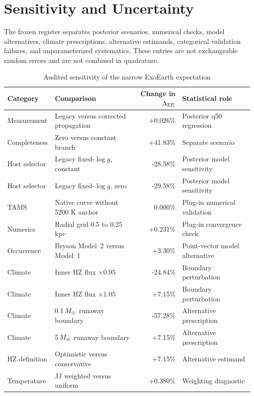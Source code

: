 \section{Sensitivity and Uncertainty}\label{sec:sensitivity}

The frozen register separates posterior scenarios, numerical checks, model
alternatives, climate prescriptions, alternative estimands, categorical
validation failures, and unparameterized systematics. These entries are not
exchangeable random errors and are not combined in quadrature.

\begin{table}[t]
\caption{Audited sensitivity of the narrow ExoEarth expectation}
\label{tab:sensitivity}
\centering
\small
\begin{tabular}{llrl}
\toprule
Category & Comparison & Change in $\Lambda_{\rm EE}$ & Statistical role\\
\midrule
Measurement & Legacy versus corrected propagation & +0.026\% & Posterior q50 regression\\
Completeness & Zero versus constant branch & +41.83\% & Separate scenario\\
Host selector & Legacy fixed-$\log g$, constant & -28.58\% & Posterior model sensitivity\\
Host selector & Legacy fixed-$\log g$, zero & -29.58\% & Posterior model sensitivity\\
TAMS & Native curve without 5200 K anchor & 0.000\% & Plug-in numerical validation\\
Numerics & Radial grid 0.5 to 0.25 kpc & +0.231\% & Plug-in convergence check\\
Occurrence & Bryson Model~2 versus Model~1 & +3.30\% & Point-vector model alternative\\
Climate & Inner HZ flux $\times0.95$ & -24.84\% & Boundary perturbation\\
Climate & Inner HZ flux $\times1.05$ & +7.15\% & Boundary perturbation\\
Climate & $0.1\,M_{\oplus}$ runaway boundary & -57.28\% & Alternative prescription\\
Climate & $5\,M_{\oplus}$ runaway boundary & +7.15\% & Alternative prescription\\
HZ definition & Optimistic versus conservative & +7.15\% & Alternative estimand\\
Temperature & JJ weighted versus uniform & +0.380\% & Weighting diagnostic\\
\bottomrule
\end{tabular}
\end{table}

